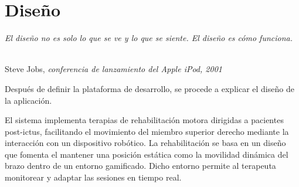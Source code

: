 \chapter{Diseño}
\label{cap:capitulo4}

\begin{flushright}
\begin{minipage}[]{9cm}
\emph{El diseño no es solo lo que se ve y lo que se siente. El diseño es cómo funciona.}\\
\end{minipage}\\

Steve Jobs, \textit{conferencia de lanzamiento del Apple iPod, 2001}\\
\end{flushright}

\vspace{1cm}

Después de definir la plataforma de desarrollo, se procede a explicar el diseño de la aplicación.

El sistema implementa terapias de rehabilitación motora dirigidas a pacientes post-ictus, facilitando el movimiento del miembro superior derecho mediante la interacción con un dispositivo robótico.
La rehabilitación se basa en un diseño que fomenta el mantener una posición estática como la movilidad dinámica del brazo dentro de un entorno gamificado.
Dicho entorno permite al terapeuta monitorear y adaptar las sesiones en tiempo real.

